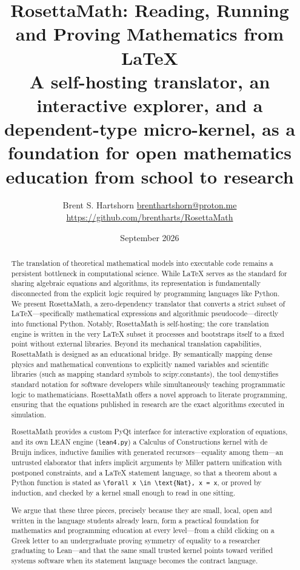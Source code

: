 \documentclass[11pt]{article}
\title{RosettaMath: Reading, Running and Proving Mathematics from \LaTeX{}\\
\large A self-hosting translator, an interactive explorer, and a dependent-type
micro-kernel, as a foundation for open mathematics education from school to research}
\author{Brent S. Hartshorn \orcidlink{0009-0004-2853-655X} \small \url{brenthartshorn@proton.me} \\
\small \url{https://github.com/brentharts/RosettaMath}}
\date{September 2026}
\begin{document}
\maketitle

\begin{abstract}
The translation of theoretical mathematical models into executable code remains a persistent bottleneck in computational science. While \LaTeX{} serves as the standard for sharing algebraic equations and algorithms, its representation is fundamentally disconnected from the explicit logic required by programming languages like Python. We present RosettaMath, a zero-dependency translator that converts a strict subset of LaTeX---specifically mathematical expressions and algorithmic pseudocode---directly into functional Python. Notably, RosettaMath is self-hosting; the core translation engine is written in the very \LaTeX{} subset it processes and bootstraps itself to a fixed point without external libraries. Beyond its mechanical translation capabilities, RosettaMath is designed as an educational bridge. By semantically mapping dense physics and mathematical conventions to explicitly named variables and scientific libraries (such as mapping standard symbols to scipy.constants), the tool demystifies standard notation for software developers while simultaneously teaching programmatic logic to mathematicians. RosettaMath offers a novel approach to literate programming, ensuring that the equations published in research are the exact algorithms executed in simulation.

RosettaMath provides a custom PyQt interface for interactive exploration of equations, 
and its own LEAN engine (\texttt{lean4.py}) a Calculus of Constructions kernel with de Bruijn
indices, inductive families with generated recursors---equality among them---an untrusted
elaborator that infers implicit arguments by Miller pattern unification with
postponed constraints, and a \LaTeX{} statement language, so that a theorem
about a Python function is stated as
\verb|\forall x \in \text{Nat}, x = x|, or proved by induction, and checked
by a kernel small enough to read in one sitting. 

We argue that these three pieces, precisely because they are small, local, open and written in the language students
already learn, form a practical foundation for mathematics and programming
education at every level---from a child clicking on a Greek letter to an
undergraduate proving symmetry of equality to a researcher graduating to
Lean---and that the same small trusted kernel points toward verified systems
software when its statement language becomes the contract language.

\end{abstract}
\end{document}
